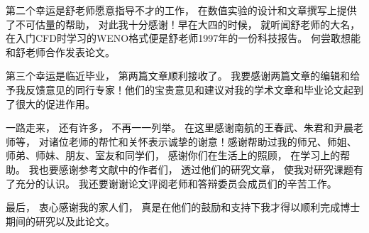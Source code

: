 第二个幸运是舒老师愿意指导不才的工作，
在数值实验的设计和文章撰写上提供了不可估量的帮助，
对此我十分感谢！早在大四的时候，
就听闻舒老师的大名，
在入门CFD时学习的WENO格式便是舒老师1997年的一份科技报告。
何尝敢想能和舒老师合作发表论文。

第三个幸运是临近毕业，
第两篇文章顺利接收了。
我要感谢两篇文章的编辑和给予我反馈意见的同行专家！他们的宝贵意见和建议对我的学术文章和毕业论文起到了很大的促进作用。

一路走来，
还有许多，
不再一一列举。
在这里感谢南航的王春武、朱君和尹晨老师等，
对诸位老师的帮忙和关怀表示诚挚的谢意！感谢帮助过我的师兄、师姐、师弟、师妹、朋友、室友和同学们，
感谢你们在生活上的照顾，
在学习上的帮助。
我也要感谢参考文献中的作者们，
透过他们的研究文章，
使我对研究课题有了充分的认识。
我还要谢谢论文评阅老师和答辩委员会成员们的辛苦工作。

最后，
衷心感谢我的家人们，
真是在他们的鼓励和支持下我才得以顺利完成博士期间的研究以及此论文。